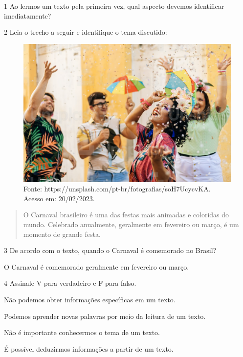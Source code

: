 \num{1}  Ao lermos um texto pela primeira vez, qual aspecto devemos identificar imediatamente?



\num{2} Leia o trecho a seguir e identifique o tema discutido:

\begin{figure}[htpb!]
\includegraphics[width=.5\textwidth]{./imgs/img2.jpg}
\caption{Fonte: https://unsplash.com/pt-br/fotografias/soH7UcycvKA. Acesso em: 20/02/2023.}
\end{figure}

\begin{quote}
O Carnaval brasileiro é uma das festas mais animadas e coloridas do
mundo. Celebrado anualmente, geralmente em fevereiro ou março, é um
momento de grande festa.
\end{quote}



\num{3} De acordo com o texto, quando o Carnaval é comemorado no Brasil?


O Carnaval é comemorado geralmente em fevereiro ou março.

\num{4} Assinale V para verdadeiro e F para falso.

\begin{boxlist}
\item Não podemos obter informações específicas em um texto. 

\item Podemos aprender novas palavras por meio da leitura de um texto. 

\item Não é importante conhecermos o tema de um texto. 

\item É possível deduzirmos informações a partir de um texto. 
\end{boxlist}

